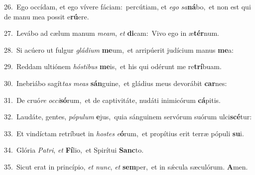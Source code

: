{\numbfont\textcolor{\numbcolor}{26.}}~Ego occídam, et ego vívere fáciam:~\dagger percútiam, et \textit{e}\-\textit{go} \textit{sa}\-\textbf{ná}bo,~\star et non est qui de manu mea possit e\-\textbf{rú}\-ere.\par
{\numbfont\textcolor{\numbcolor}{27.}}~Levábo ad cælum manum \textit{me}\-\textit{am}, \textit{et} \textbf{di}\-cam:~\star Vivo ego in æ\-\textbf{tér}\-num.\par
{\numbfont\textcolor{\numbcolor}{28.}}~Si acúero ut fulgur \textit{glá}\-\textit{di}\textit{um} \textbf{me}\-um,~\star et arripúerit judícium manus \textbf{me}\-a:\par
{\numbfont\textcolor{\numbcolor}{29.}}~Reddam ultiónem \textit{hós}\-\textit{ti}\textit{bus} \textbf{me}\-is,~\star et his qui odérunt me re\-\textbf{trí}\-buam.\par
{\numbfont\textcolor{\numbcolor}{30.}}~Inebriábo sagít\textit{tas} \textit{me}\-\textit{as} \textbf{sán}\-guine,~\star et gládius meus devorábit \textbf{car}\-nes:\par
{\numbfont\textcolor{\numbcolor}{31.}}~De cruó\textit{re} \textit{oc}\-\textit{ci}\textbf{só}rum,~\star et de captivitáte, nudáti inimicórum \textbf{cá}\-pitis.\par
{\numbfont\textcolor{\numbcolor}{32.}}~Laudáte, gentes, \textit{pó}\-\textit{pu}\textit{lum} \textbf{e}\-jus,~\star quia sánguinem servórum suórum ulci\-\textbf{scé}\-tur:\par
{\numbfont\textcolor{\numbcolor}{33.}}~Et vindíctam retríbuet in \textit{hos}\-\textit{tes} \textit{e}\-\textbf{ó}rum,~\star et propítius erit terræ pópuli \textbf{su}\-i.\par
{\numbfont\textcolor{\numbcolor}{34.}}~Glória \textit{Pa}\-\textit{tri}, \textit{et} \textbf{Fí}\-lio,~\star et Spirítui \textbf{Sanc}\-to.\par
{\numbfont\textcolor{\numbcolor}{35.}}~Sicut erat in princípio, \textit{et} \textit{nunc}\-, \textit{et} \textbf{sem}\-per,~\star et in sǽcula sæculórum. \textbf{A}\-men.\par
